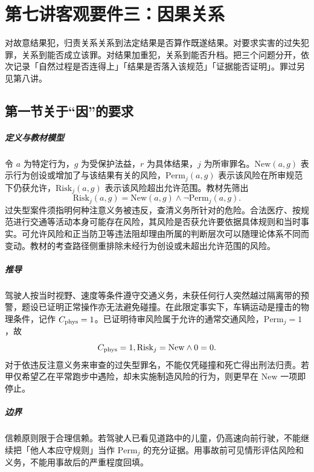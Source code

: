 \chapter{第七讲\quad 客观要件三：因果关系}
\label{lecture:07}
\par

对故意结果犯，归责关系关系到法定结果是否算作既遂结果。对要求实害的过失犯罪，关系到能否成立该罪。对结果加重犯，关系到能否升档。把三个问题分开，依次记录「自然过程是否连得上」「结果是否落入该规范」「证据能否证明」。罪过另见第八讲。

\section{第一节\quad 关于“因”的要求}

\paragraph{定义与教材模型}
令 $a$ 为特定行为，$g$ 为受保护法益，$r$ 为具体结果，$j$ 为所审罪名。$\mathrm{New}(a,g)$ 表示行为创设或增加了与该结果有关的风险，$\mathrm{Perm}_j(a,g)$ 表示该风险在所审规范下仍获允许，$\mathrm{Risk}_j(a,g)$ 表示该风险超出允许范围。教材先筛出
\[
\mathrm{Risk}_j(a,g)=\mathrm{New}(a,g)\land\neg\mathrm{Perm}_j(a,g).
\]
过失型案件须指明何种注意义务被违反，查清义务所针对的危险。合法医疗、按规范进行交通等活动本身可能存在风险，其风险是否获允许要依据具体规则和当时事实。可允许风险和正当防卫等违法阻却理由所属的判断层次可以随理论体系不同而变动。教材的考查路径侧重排除未经行为创设或未超出允许范围的风险。

\paragraph{推导}
驾驶人按当时视野、速度等条件遵守交通义务，未获任何行人突然越过隔离带的预警，题设已证明正常操作亦无法避免碰撞。在此限定事实下，车辆运动是撞击的物理条件，记作 $C_{\rm phys}=1$。已证明待审风险属于允许的通常交通风险，$\mathrm{Perm}_j=1$，故
\[
C_{\rm phys}=1,\quad
\mathrm{Risk}_j=\mathrm{New}\land 0=0.
\]
对于依违反注意义务来审查的过失型罪名，不能仅凭碰撞和死亡得出刑法归责。若甲仅希望乙在平常跑步中遇险，却未实施制造风险的行为，则更早在 $\mathrm{New}$ 一项即停止。

\paragraph{边界}
信赖原则限于合理信赖。若驾驶人已看见道路中的儿童，仍高速向前行驶，不能继续把「他人本应守规则」当作 $\mathrm{Perm}_j$ 的充分证据。用事故前可见情形评估风险和义务，不能用事故后的严重程度回填。

